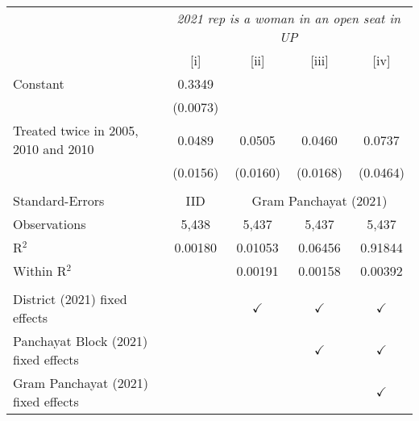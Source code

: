 
\begingroup
\centering
\begin{tabular}{lcccc}
   \toprule
    & \multicolumn{4}{c}{\textit{2021 rep is a woman in an open seat in UP}}\\
                                        & [i]      & [ii]          & [iii]         & [iv]\\  
   \midrule 
   Constant                             & 0.3349   &               &               &   \\   
                                        & (0.0073) &               &               &   \\   
   Treated twice in 2005, 2010 and 2010 & 0.0489   & 0.0505        & 0.0460        & 0.0737\\   
                                        & (0.0156) & (0.0160)      & (0.0168)      & (0.0464)\\   
    \\
   Standard-Errors & IID & \multicolumn{3}{c}{Gram Panchayat (2021)} \\ 
   Observations                         & 5,438    & 5,437         & 5,437         & 5,437\\  
   R$^2$                                & 0.00180  & 0.01053       & 0.06456       & 0.91844\\  
   Within R$^2$                         &          & 0.00191       & 0.00158       & 0.00392\\  
    \\
   District (2021) fixed effects        &          & $\checkmark$  & $\checkmark$  & $\checkmark$\\   
   Panchayat Block (2021) fixed effects &          &               & $\checkmark$  & $\checkmark$\\   
   Gram Panchayat (2021) fixed effects  &          &               &               & $\checkmark$\\   
   \bottomrule
\end{tabular}
\par\endgroup


